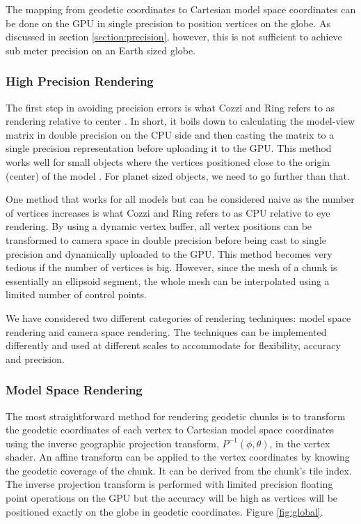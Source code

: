The mapping from geodetic coordinates to Cartesian model space coordinates can be done on the GPU in single precision to position vertices on the globe. As discussed in section \ref{section:precision}, however, this is not sufficient to achieve sub meter precision on an Earth sized globe.

\subsubsection{High Precision Rendering}

The first step in avoiding precision errors is what Cozzi and Ring refers to as rendering relative to center \cite{cozzi11}. In short, it boils down to calculating the model-view matrix in double precision on the CPU side and then casting the matrix to a single precision representation before uploading it to the GPU. This method works well for small objects where the vertices positioned close to the origin (center) of the model \cite{cozzi11}. For planet sized objects, we need to go further than that.

One method that works for all models but can be considered naive as the number of vertices increases is what Cozzi and Ring refers to as CPU relative to eye rendering. By using a dynamic vertex buffer, all vertex positions can be transformed to camera space in double precision before being cast to single precision and dynamically uploaded to the GPU. This method becomes very tedious if the number of vertices is big. However, since the mesh of a chunk is essentially an ellipsoid segment, the whole mesh can be interpolated using a limited number of control points.

We have considered two different categories of rendering techniques: model space rendering and camera space rendering. The techniques can be implemented differently and used at different scales to accommodate for flexibility, accuracy and precision.

\subsubsection{Model Space Rendering}

The most straightforward method for rendering geodetic chunks is to transform the geodetic coordinates of each vertex to Cartesian model space coordinates using the inverse geographic projection transform, $P^{-1}(\phi, \theta)$, in the vertex shader. An affine transform can be applied to the vertex coordinates by knowing the geodetic coverage of the chunk. It can be derived from the chunk's tile index. The inverse projection transform is performed with limited precision floating point operations on the GPU but the accuracy will be high as vertices will be positioned exactly on the globe in geodetic coordinates. Figure \ref{fig:global}.

